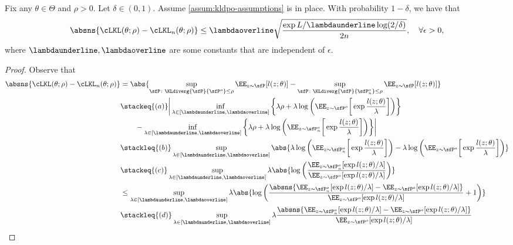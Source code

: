 \begin{lemma}\label{lem:convergence-of-kldpo-loss}
    Fix any $\theta\in\Theta$ and $\rho>0$. Let $\delta\in(0,1)$. Assume \cref{assum:kldpo-assumptions} is in place. With probability $1-\delta$, we have that
    \begin{equation*}
        \absns{\cLKL(\theta;\rho)-\cLKL_n(\theta;\rho)} \leq \lambdaoverline\sqrt{\frac{\exp{L/\lambdaunderline}\log(2/\delta)}{2n}}, \quad \forall\epsilon>0,
    \end{equation*}
    where $\lambdaunderline,\lambdaoverline$ are some constants that are independent of $\epsilon$.
\end{lemma}
\begin{proof}
Observe that
\begin{align*}
    \absns{\cLKL(\theta;\rho)-\cLKL_n(\theta;\rho)} &= \abs{\sup_{\sfP\colon \KLdiverg{\sfP}{\sfP^o}\leq\rho}\EE_{z\sim\sfP}[l(z;\theta)] - \sup_{\sfP\colon \KLdiverg{\sfP}{\sfP^o_n}\leq\rho}\EE_{z\sim\sfP}[l(z;\theta)]} \\
    &\stackeq{(a)} \bigg\lvert \inf_{\lambda\in[\lambdaunderline,\lambdaoverline]}\bigg\{\lambda\rho + \lambda\log\bigg(\EE_{z\sim\sfP^o}\bigg[ \exp{\frac{l(z;\theta)}{\lambda}}\bigg]\bigg)\bigg\}  \\
    &\quad\quad- \inf_{\lambda\in[\lambdaunderline,\lambdaoverline]}\bigg\{\lambda\rho + \lambda\log\bigg(\EE_{z\sim\sfP^o_n}\bigg[ \exp{\frac{l(z;\theta)}{\lambda}}\bigg]\bigg)\bigg\} \bigg\rvert\\
    &\stackleq{(b)} \sup_{\lambda\in[\lambdaunderline,\lambdaoverline]} \abs{\lambda\log\bigg(\EE_{z\sim\sfP^o_n}\bigg[ \exp{\frac{l(z;\theta)}{\lambda}}\bigg]\bigg) - \lambda\log\bigg(\EE_{z\sim\sfP^o}\bigg[ \exp{\frac{l(z;\theta)}{\lambda}}\bigg]\bigg)} \\
    &\stackeq{(c)} \sup_{\lambda\in[\lambdaunderline,\lambdaoverline]} \lambda \abs{\log\bigg( \frac{\EE_{z\sim\sfP^o_n}[\exp{l(z;\theta)}/\lambda]}{\EE_{z\sim\sfP^o}[\exp{l(z;\theta)}/\lambda]}\bigg)} \\
    &\leq \sup_{\lambda\in[\lambdaunderline,\lambdaoverline]} \lambda \abs{\log\bigg( \frac{\absns{\EE_{z\sim\sfP^o_n}[\exp{l(z;\theta)}/\lambda] - \EE_{z\sim\sfP^o}[\exp{l(z;\theta)}/\lambda]}}{\EE_{z\sim\sfP^o}[\exp{l(z;\theta)}/\lambda]} + 1\bigg)} \\
    &\stackleq{(d)} \sup_{\lambda\in[\lambdaunderline,\lambdaoverline]} \lambda\frac{\absns{\EE_{z\sim\sfP^o_n}[\exp{l(z;\theta)}/\lambda] - \EE_{z\sim\sfP^o}[\exp{l(z;\theta)}/\lambda]}}{\EE_{z\sim\sfP^o}[\exp{l(z;\theta)}/\lambda]} \\

\end{align*}
\end{proof}
